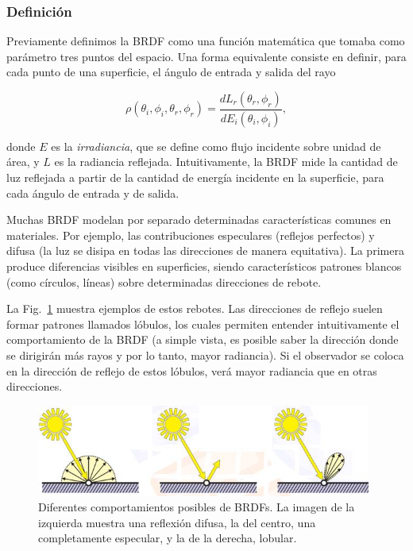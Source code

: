 \subsubsection{Definición}
Previamente definimos la BRDF como una función matemática que tomaba como parámetro tres puntos del espacio.
Una forma equivalente consiste en definir, para cada punto de una superficie, el ángulo de entrada y salida del rayo

$$\rho(\theta_{i},\phi_{i},\theta_{r},\phi_{r}) = \frac{dL_{r}(\theta_{r},\phi_{r})}{dE_{i}(\theta_{i},\phi_{i})},$$

donde $E$ es la {\em irradiancia}, que se define como flujo incidente sobre unidad de área, y $L$ es la radiancia reflejada.
Intuitivamente, la BRDF mide la cantidad de luz reflejada a partir de la cantidad de energía incidente en la superficie, para cada ángulo de entrada y de salida.

Muchas BRDF modelan por separado determinadas características comunes en materiales.
Por ejemplo, las contribuciones especulares (reflejos perfectos) y difusa (la luz se disipa en todas las direcciones de manera equitativa).
La primera produce diferencias visibles en superficies, siendo característicos patrones blancos (como círculos, líneas) sobre determinadas direcciones de rebote.

La Fig.~\ref{fg:contribuciones} muestra ejemplos de estos rebotes.
Las direcciones de reflejo suelen formar patrones llamados lóbulos, los cuales permiten entender intuitivamente el comportamiento de la BRDF (a simple vista, es posible saber la dirección donde se dirigirán más rayos y por lo tanto, mayor radiancia).
Si el observador se coloca en la dirección de reflejo de estos lóbulos, verá mayor radiancia que en otras direcciones.

\begin{figure}
\center
\includegraphics[width=11cm]{figures/contribuciones}
\caption{Diferentes comportamientos posibles de BRDFs. La imagen de la izquierda muestra una reflexión difusa, la del centro, una completamente especular, y la de la derecha, lobular.}
\label{fg:contribuciones}
\end{figure}

